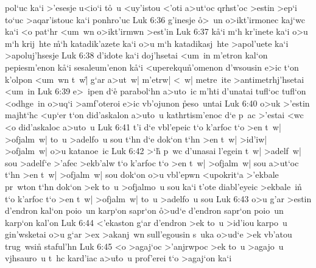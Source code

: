 pol`uc
ka`i
>'esesje
u<io`i
t\r{o}~u
<uy'istou
<'oti
a>ut`oc
qrhst'oc
>estin
>ep`i
to`uc
>aqar'istouc
ka`i
ponhro'uc\bibvsend
\vs Luk 6:36
g'inesje
\r{o}>~un
o>ikt'irmonec
kaj`wc
ka`i
<o
pat`hr
<um~wn
o>ikt'irmwn
>est'in\bibvsend
\vs Luk 6:37
k\r{a}`i
m`h
kr'inete
ka`i
o>u
m`h
krij~hte
\r{m}`h
katadik'azete
ka`i
o>u
m`h
katadikasj~hte
>apol'uete
ka`i
>apoluj'hsesje\bibvsend
\vs Luk 6:38
d'idote
ka`i
doj'hsetai
<um~in
m'etron
kal`on
pepiesm'enon
k\r{a}`i
sesaleum'enon
k\r{a}`i
<uperekqu\r{n}'omenon
d'wsousin
e>ic
t`on
k'olpon
<um~wn
t~w|\r{}
g`ar
a>ut~w|
m'etrw|
<~w|
metre~ite
>antimetrhj'hsetai
<um~in\bibvsend
\vs Luk 6:39
e>~ipen
d`e\r{}
parabol`hn
a>uto~ic
m'hti
d'unatai
tufl`oc
tufl`on
<odhge~in
o>uq`i
>amf'oteroi
e>ic
vb'ojunon
\r{p}eso~untai\bibvsend
{}
\vs Luk 6:40
o>uk
>'estin
majht`hc
<up`er
t`on
did'askalon
a>u\r{t}o~u
kathrtism'enoc
d`e
p~ac
>'estai
<wc
<o
did'askaloc
a>uto~u\bibvsend
\vs Luk 6:41
t'i
d`e
vbl'epeic
t`o
k'arfoc
t`o
>en
t~w|
>ofjalm~w|
to~u
>adelfo~u
sou
t`hn
d`e
dok`on
t`hn
>en
t~w|
>id'iw|
>ofjalm~w|
o>u
katanoe~ic\bibvsend
\vs Luk 6:42
>`h\r{}
p~wc
d'unasai
l'egein
t~w|
>adelf~w|
sou
>adelf`e
>'afec
>ekb'alw
t`o
k'arfoc
t`o
>en
t~w|
>ofjalm~w|
sou
a>ut`oc
t`hn
>en
t~w|
>ofjalm~w|
sou
dok`on
o>u
vbl'epwn
<upokrit`a
>'ekbale
pr~wton
t`hn
dok`on
>ek
to~u
>ofjalmo~u
sou
ka`i
t'ote
diabl'eyeic
>ekbale~in\r{}
t`o
k'arfoc
t`o
>en
t~w|
>ofjalm~w|
to~u
>adelfo~u
sou\bibvsend
\vs Luk 6:43
o>u
g'ar
>estin
d'endron
kal`on
poio~un
karp`on
sapr`on
\r{o}>ud`e
d'endron
sapr`on
poio~un
karp`on
kal'on\bibvsend
\vs Luk 6:44
<'ekaston
g`ar
d'endron
>ek
to~u
>id'iou
karpo~u
gin'wsketai
o>u
g`ar
>ex
>akanj~wn
sull'egousin
s~uka
o>ud`e
>ek
vb'atou
trug~wsin\r{}
staful'hn\bibvsend
\vs Luk 6:45
<o
>agaj`oc
>'anjrwpoc
>ek
to~u
>agajo~u
vjhsauro~u
t~hc
kard'iac
a>u\r{t}o~u
prof'erei
t`o
>agaj`on
ka`i
